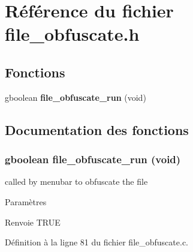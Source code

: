 \section{Référence du fichier file\_\-obfuscate.h}
\label{file__obfuscate_8h}
\subsection*{Fonctions}
\begin{DoxyCompactItemize}
\item 
gboolean {\bf file\_\-obfuscate\_\-run} (void)
\end{DoxyCompactItemize}


\subsection{Documentation des fonctions}
\subsubsection[{file\_\-obfuscate\_\-run}]{\setlength{\rightskip}{0pt plus 5cm}gboolean file\_\-obfuscate\_\-run (void)}\label{file__obfuscate_8h_ab4c30cf882f9fd42b304325a0501e3b1}
called by menubar to obfuscate the file


\begin{DoxyParams}{Paramètres}
\item[{\em }]\end{DoxyParams}
\begin{DoxyReturn}{Renvoie}
TRUE 
\end{DoxyReturn}


Définition à la ligne 81 du fichier file\_\-obfuscate.c.

